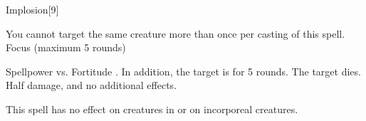 \begin{spellsection}{Implosion}[9]
    \begin{spellheader}
    \end{spellheader}
    \begin{spellcontent}
        \begin{spelltargetinginfo}
            \spellspecial You cannot target the same creature more than once per casting of this spell.
            \spelldur Focus (maximum 5 rounds)
        \end{spelltargetinginfo}
        \begin{spelleffects}
            \begin{spellattack}{Spellpower vs. Fortitude}
                \spellsuccess {}. In addition, the target is \staggered for 5 rounds.
                \spellcritical The target dies.
                \spellfailure Half damage, and no additional effects.
            \end{spellattack}
        \end{spelleffects}
    \end{spellcontent}
    \begin{spellfooter}
        \spellnotes This spell has no effect on creatures in  or on incorporeal creatures.
        \miscastexplode
    \end{spellfooter}
\end{spellsection}

